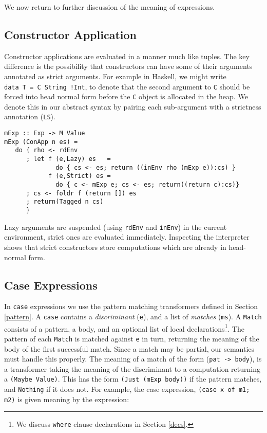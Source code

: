 \documentclass{entcs} \usepackage{entcsmacro}
\begin{document}
{We now return to further discussion of the meaning of expressions.

\subsection{Constructor Application}

Constructor applications are evaluated in a manner much like tuples. The key
difference is the possibility that constructors can have some of their arguments
annotated as strict arguments. For example in Haskell, we might write\\ {\tt data
T = C String !Int}, to denote that the second argument to {\tt C} should be forced
into head normal form before the {\tt C} object is allocated in the heap. We
denote this in our abstract syntax by pairing each sub-argument with a strictness
annotation ({\tt LS}).

{\small
\begin{verbatim}
mExp :: Exp -> M Value
mExp (ConApp n es) = 
   do { rho <- rdEnv
      ; let f (e,Lazy) es   = 
              do { cs <- es; return ((inEnv rho (mExp e)):cs) }
            f (e,Strict) es = 
              do { c <- mExp e; cs <- es; return((return c):cs)}
      ; cs <- foldr f (return []) es
      ; return(Tagged n cs)
      }  
\end{verbatim}
}

Lazy arguments are suspended (using {\tt rdEnv} and {\tt inEnv}) in the current
environment, strict ones are evaluated immediately.  Inspecting the interpreter
shows that strict constructors store computations which are already in head-normal
form.

\subsection{Case Expressions}

In {\tt case} expressions we use the pattern matching transformers defined in
Section \ref{pattern}. A {\tt case} contains a {\em discriminant} ({\tt e}), and a
list of {\em matches} ({\tt ms}). A {\tt Match} consists of a pattern, a body, and
an optional list of local declarations\footnote{We discuss {\tt where} clause
declarations in Section \ref{decs}.}. The pattern of each {\tt Match} is matched
against {\tt e} in turn, returning the meaning of the body of the first successful
match. Since a match may be partial, our semantics must handle this properly. The meaning
of a match of the form ({\tt pat -> body}), is a transformer taking the meaning of
the discriminant to a computation returning a {\tt (Maybe Value)}. This has the
form {\tt (Just (mExp body))} if the pattern matches, and {\tt Nothing} if it does
not. For example, the case expression, {\tt (case x of m1; m2)} is given meaning
by the expression:

}
\end{document}
